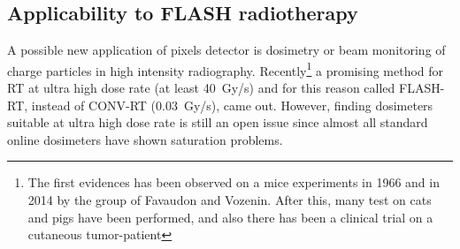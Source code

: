     \subsection{Applicability to FLASH radiotherapy}
        A possible new application of pixels detector is dosimetry or beam monitoring of charge particles in high intensity radiography.
        Recently\footnote{The first evidences has been observed on a mice experiments in 1966 and in 2014 by the group of Favaudon and Vozenin. After this, many test on cats and pigs have been performed, and also there has been a clinical trial on a cutaneous tumor-patient} a promising method for RT at ultra high dose rate (at least \SI{40}{Gy/s}) and for this reason called FLASH-RT\cite{FLASH_review}, instead of CONV-RT (\SI{0.03}{Gy/s}), came out. However, finding dosimeters suitable at ultra high dose rate is still an open issue since almost all standard online dosimeters have shown saturation problems.

